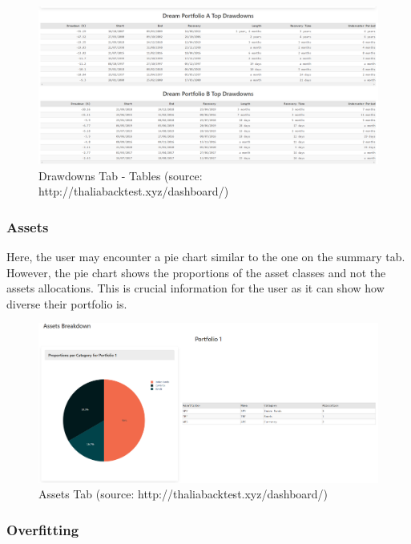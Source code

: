 \documentclass[main.tex]{subfiles}
\begin{document}
\begin{figure}[H]
   \centering
   \includegraphics[width=\textwidth]{08Appendices/081User/081Pictures/drawdowns_tables.png}
   \caption{Drawdowns Tab - Tables (source: http://thaliabacktest.xyz/dashboard/)}
   \label{drawdowns_table}
\end{figure}



\subsubsection{Assets}

Here, the user may encounter a pie chart similar to the one on the summary tab. However, the pie chart shows the proportions of the asset classes and not the assets allocations. This is crucial information for the user as it can show how diverse their portfolio is.

\begin{figure}[H]
   \centering
   \includegraphics[width=\textwidth]{08Appendices/081User/081Pictures/assets.png}
   \caption{Assets Tab (source: http://thaliabacktest.xyz/dashboard/)}
   \label{assets_tab}
\end{figure}

\subsubsection{Overfitting}
\end{document}
